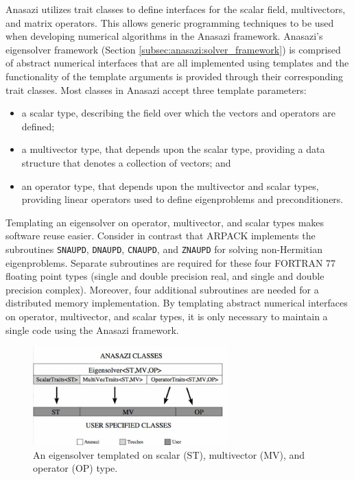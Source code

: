 \documentclass[acmtoms]{acmtrans2m}
\newcounter{algorithm}
\begin{document}
Anasazi utilizes trait \cite{myer:95,veld:96} classes to define interfaces for the scalar field,
multivectors, and matrix operators. This allows generic programming techniques to
be used when developing numerical algorithms in the Anasazi framework.  
Anasazi's eigensolver framework (Section  
\ref{subsec:anasazi:solver_framework}) is comprised of abstract numerical interfaces
that are all implemented using templates and the functionality of the 
template arguments is provided through their corresponding trait classes.
Most classes in Anasazi accept
three template parameters:
\begin{itemize}
\item
a scalar type, describing the field over which the vectors and
operators are defined;
\item
a multivector type, that depends upon the scalar type, providing a
data structure that denotes a collection of vectors; and
\item
an operator type, that depends upon the multivector and scalar types,
providing linear operators used to define eigenproblems and
preconditioners.
\end{itemize}

Templating an eigensolver on operator, multivector, and scalar types makes software reuse
easier. Consider in contrast that ARPACK implements the subroutines \texttt{SNAUPD},
\texttt{DNAUPD}, \texttt{CNAUPD}, and \texttt{ZNAUPD} for solving non-Hermitian
eigenproblems. Separate subroutines are required for these four FORTRAN 77 floating
point types (single and double precision real, and single and double precision complex).
Moreover, four additional subroutines are needed for a distributed memory implementation.
By templating abstract numerical interfaces on operator, multivector, and scalar types, 
it is only necessary to maintain a single code using the Anasazi framework.

\begin{figure}[htb]
\label{fig:latemplate}
\begin{center}
\includegraphics[height=1.5in]{anasazi_linalg_template}
\end{center}
\caption{An eigensolver templated on scalar (ST), multivector (MV), and
operator (OP) type.}
\end{figure}
\end{document}

